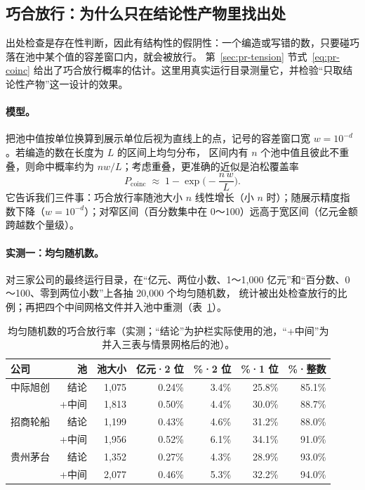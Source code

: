 \subsection{巧合放行：为什么只在结论性产物里找出处}
\label{sec:guards-coinc}

出处检查是存在性判断，因此有结构性的假阴性：一个编造或写错的数，只要碰巧落在池中某个值的容差窗口内，就会被放行。
第~\ref{sec:pr-tension} 节式~\eqref{eq:pr-coinc} 给出了巧合放行概率的估计。这里用真实运行目录测量它，并检验“只取结论性产物”这一设计的效果。

\paragraph{模型。}把池中值按单位换算到展示单位后视为直线上的点，记号的容差窗口宽 $w=10^{-d}$。若编造的数在长度为 $L$ 的区间上均匀分布，
区间内有 $n$ 个池中值且彼此不重叠，则命中概率约为 $nw/L$；考虑重叠，更准确的近似是泊松覆盖率
\begin{equation}
P_{\text{coinc}} \;\approx\; 1-\exp\!\Big(-\frac{n\,w}{L}\Big).
\label{eq:guards-poisson}
\end{equation}
它告诉我们三件事：巧合放行率随池大小 $n$ 线性增长（小 $n$ 时）；随展示精度指数下降（$w=10^{-d}$）；对窄区间（百分数集中在 0～100）远高于宽区间（亿元金额跨越数个量级）。

\paragraph{实测一：均匀随机数。}对三家公司的最终运行目录，在“亿元、两位小数、1～1,000 亿元”和“百分数、0～100、零到两位小数”上各抽 20,000 个均匀随机数，
统计被出处检查放行的比例；再把四个中间网格文件并入池中重测（表~\ref{tab:guards-coinc}）。

\begin{table}[t]
\centering
\caption{均匀随机数的巧合放行率（实测；“结论”为护栏实际使用的池，“+中间”为并入三表与情景网格后的池）。}
\label{tab:guards-coinc}
\small
\begin{tabular}{@{}lrrrrrr@{}}
\toprule
公司 & 池 & 池大小 & 亿元·2 位 & \%·2 位 & \%·1 位 & \%·整数 \\
\midrule
中际旭创 & 结论 & 1,075 & 0.24\% & 3.4\% & 25.8\% & 85.1\% \\
         & +中间 & 1,813 & 0.50\% & 4.4\% & 30.0\% & 88.7\% \\
招商轮船 & 结论 & 1,199 & 0.43\% & 4.6\% & 31.2\% & 88.0\% \\
         & +中间 & 1,956 & 0.52\% & 6.1\% & 34.1\% & 91.0\% \\
贵州茅台 & 结论 & 1,352 & 0.27\% & 4.3\% & 28.9\% & 93.0\% \\
         & +中间 & 2,077 & 0.46\% & 5.3\% & 32.2\% & 94.0\% \\
\bottomrule
\end{tabular}
\end{table}

